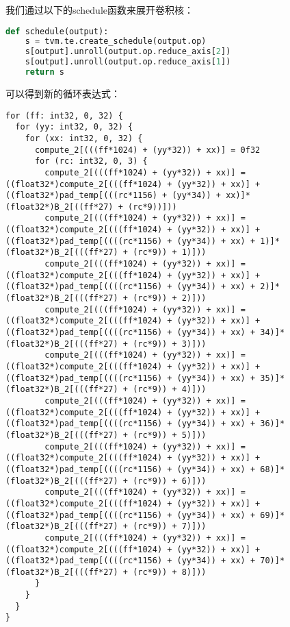 我们通过以下的schedule函数来展开卷积核：

\begin{lstlisting}[caption=卷积核循环展开,language=python]
def schedule(output):
    s = tvm.te.create_schedule(output.op)
    s[output].unroll(output.op.reduce_axis[2])
    s[output].unroll(output.op.reduce_axis[1])
    return s
\end{lstlisting}

可以得到新的循环表达式：

\begin{lstlisting}[caption=卷积核展开后的循环表达式]
for (ff: int32, 0, 32) {
  for (yy: int32, 0, 32) {
    for (xx: int32, 0, 32) {
      compute_2[(((ff*1024) + (yy*32)) + xx)] = 0f32
      for (rc: int32, 0, 3) {
        compute_2[(((ff*1024) + (yy*32)) + xx)] = ((float32*)compute_2[(((ff*1024) + (yy*32)) + xx)] + ((float32*)pad_temp[(((rc*1156) + (yy*34)) + xx)]*(float32*)B_2[((ff*27) + (rc*9))]))
        compute_2[(((ff*1024) + (yy*32)) + xx)] = ((float32*)compute_2[(((ff*1024) + (yy*32)) + xx)] + ((float32*)pad_temp[((((rc*1156) + (yy*34)) + xx) + 1)]*(float32*)B_2[(((ff*27) + (rc*9)) + 1)]))
        compute_2[(((ff*1024) + (yy*32)) + xx)] = ((float32*)compute_2[(((ff*1024) + (yy*32)) + xx)] + ((float32*)pad_temp[((((rc*1156) + (yy*34)) + xx) + 2)]*(float32*)B_2[(((ff*27) + (rc*9)) + 2)]))
        compute_2[(((ff*1024) + (yy*32)) + xx)] = ((float32*)compute_2[(((ff*1024) + (yy*32)) + xx)] + ((float32*)pad_temp[((((rc*1156) + (yy*34)) + xx) + 34)]*(float32*)B_2[(((ff*27) + (rc*9)) + 3)]))
        compute_2[(((ff*1024) + (yy*32)) + xx)] = ((float32*)compute_2[(((ff*1024) + (yy*32)) + xx)] + ((float32*)pad_temp[((((rc*1156) + (yy*34)) + xx) + 35)]*(float32*)B_2[(((ff*27) + (rc*9)) + 4)]))
        compute_2[(((ff*1024) + (yy*32)) + xx)] = ((float32*)compute_2[(((ff*1024) + (yy*32)) + xx)] + ((float32*)pad_temp[((((rc*1156) + (yy*34)) + xx) + 36)]*(float32*)B_2[(((ff*27) + (rc*9)) + 5)]))
        compute_2[(((ff*1024) + (yy*32)) + xx)] = ((float32*)compute_2[(((ff*1024) + (yy*32)) + xx)] + ((float32*)pad_temp[((((rc*1156) + (yy*34)) + xx) + 68)]*(float32*)B_2[(((ff*27) + (rc*9)) + 6)]))
        compute_2[(((ff*1024) + (yy*32)) + xx)] = ((float32*)compute_2[(((ff*1024) + (yy*32)) + xx)] + ((float32*)pad_temp[((((rc*1156) + (yy*34)) + xx) + 69)]*(float32*)B_2[(((ff*27) + (rc*9)) + 7)]))
        compute_2[(((ff*1024) + (yy*32)) + xx)] = ((float32*)compute_2[(((ff*1024) + (yy*32)) + xx)] + ((float32*)pad_temp[((((rc*1156) + (yy*34)) + xx) + 70)]*(float32*)B_2[(((ff*27) + (rc*9)) + 8)]))
      }
    }
  }
}
\end{lstlisting}


